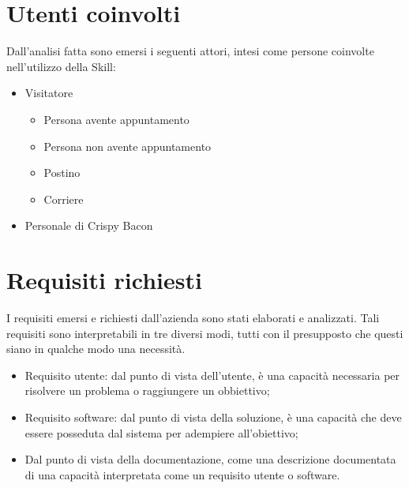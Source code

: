 \section{Utenti coinvolti}
Dall'analisi fatta sono emersi i seguenti attori, intesi come persone coinvolte nell'utilizzo della Skill:
\begin{itemize}
    \item Visitatore
        \begin{itemize}
            \item Persona avente appuntamento
            \item Persona non avente appuntamento
            \item Postino
            \item Corriere
        \end{itemize}
    \item Personale di Crispy Bacon
\end{itemize}

\section{Requisiti richiesti}
\label{requisti-richiesti}
I requisiti emersi e richiesti dall'azienda sono stati elaborati e analizzati. Tali requisiti sono interpretabili in tre diversi modi, tutti con il presupposto che questi siano in qualche modo una necessità.
\begin{itemize}
    \item Requisito utente: dal punto di vista dell'utente, è una capacità necessaria per risolvere un problema o raggiungere un obbiettivo;
    \item Requisito software: dal punto di vista della soluzione, è una capacità che deve essere posseduta dal sistema per adempiere all'obiettivo;
    \item Dal punto di vista della documentazione, come una descrizione documentata di una capacità interpretata come un requisito utente o software.
\end{itemize}
